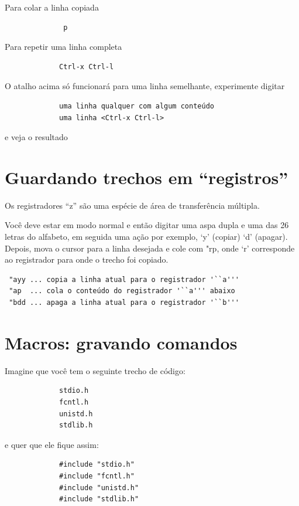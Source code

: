 \documentclass[10pt,a4paper,openany]{book}
\begin{document}
Para colar a linha copiada

\begin{verbatim}
			  p
\end{verbatim}

Para repetir uma linha completa

\begin{verbatim}
			 Ctrl-x Ctrl-l
\end{verbatim}

O atalho acima só funcionará para uma linha semelhante, experimente
digitar

\begin{verbatim}
			 uma linha qualquer com algum conteúdo
			 uma linha <Ctrl-x Ctrl-l>
\end{verbatim}

e veja o resultado

\section{Guardando trechos em ``registros''}
\label{sec:Guardando trechos em ``registros''}

Os registradores ``z'' são uma espécie de área de transferência múltipla.

Você deve estar em modo normal e então digitar uma aspa dupla e uma
das 26 letras do alfabeto, em seguida uma ação por exemplo, `y'
(copiar) `d' (apagar). Depois, mova o cursor para a linha
desejada e cole com "rp, onde `r' corresponde ao
registrador para onde o trecho foi copiado.

\begin{verbatim}
 "ayy ... copia a linha atual para o registrador '``a'''
 "ap  ... cola o conteúdo do registrador '``a''' abaixo
 "bdd ... apaga a linha atual para o registrador '``b'''
\end{verbatim}

\section{Macros: gravando comandos}\label{Macros: gravando comandos}

Imagine que você tem o seguinte trecho de código:

\begin{verbatim}
			 stdio.h
			 fcntl.h
			 unistd.h
			 stdlib.h
\end{verbatim}

e quer que ele fique assim:

\begin{verbatim}
			 #include "stdio.h"
			 #include "fcntl.h"
			 #include "unistd.h"
			 #include "stdlib.h"
\end{verbatim}
\end{document}
